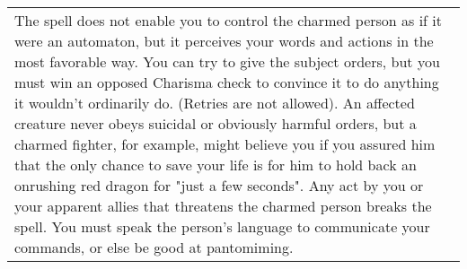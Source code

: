 \documentclass[table,10pt,a4paper,twocolumn]{book}
\begin{document}
\begin{supertabular}{p{9cm}}
The spell does not enable you to control the charmed person as if it were an automaton, but it perceives your words and actions in the most favorable way. You can try to give the subject orders, but you must win an opposed Charisma check to convince it to do anything it wouldn't ordinarily do. (Retries are not allowed). An affected creature never obeys suicidal or obviously harmful orders, but a charmed fighter, for example, might believe you if you assured him that the only chance to save your life is for him to hold back an onrushing red dragon for "just a few seconds". Any act by you or your apparent allies that threatens the charmed person breaks the spell. You must speak the person's language to communicate your commands, or else be good at pantomiming.\\
\end{supertabular}
\end{document}
